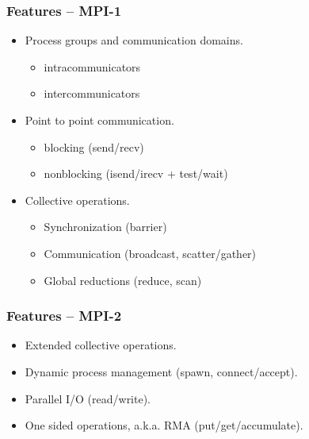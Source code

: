 \documentclass{beamer}
\begin{document}
\begin{frame}
  \frametitle{Features -- MPI-1}
  \begin{itemize}
  \item Process groups and communication domains.
    \begin{itemize}
    \item intracommunicators
    \item intercommunicators
    \end{itemize}
  \item Point to point communication.
    \begin{itemize}
    \item blocking (send/recv)
    \item nonblocking (isend/irecv + test/wait)
    \end{itemize}
  \item Collective operations.
    \begin{itemize}
    \item Synchronization (barrier)
    \item Communication (broadcast, scatter/gather)
    \item Global reductions (reduce, scan)
    \end{itemize}
  \end{itemize}
\end{frame}

\begin{frame}
  \frametitle{Features -- MPI-2}
  \begin{itemize}
  \item Extended collective operations.
  \item Dynamic process management (spawn, connect/accept).
  \item Parallel I/O (read/write).
  \item One sided operations, a.k.a. RMA (put/get/accumulate).
  \end{itemize}
\end{frame}
\end{document}
